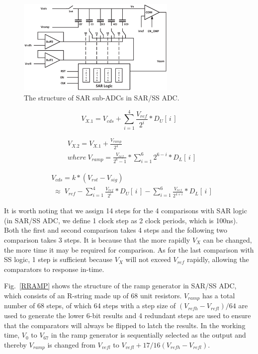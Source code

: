 \begin{figure}[htbp]
	\centerline{\includegraphics[width=3in]{./Figures/SAR.eps}}
	\caption{The structure of SAR sub-ADCs in SAR/SS ADC.}
	\label{SAR}
\end{figure}

\begin{equation}
	V_{X.1}=V_{cds}+\sum_{i=1}^{4} {\frac{V_{ref}}{2^{i}}\ast{D_{U}\left[\,i\,\right]}}
	\label{eq4}
\end{equation}

\begin{equation}
	\begin{aligned}
		&V_{X.2}=V_{X.1}+\frac{V_{ramp}}{2^4}\\ &where\  V_{ramp}=\frac{V_{ref}}{2^6-1}\ast\sum_{i=1}^{6}2^{6-i}\ast{D_{L}\left[\,i\,\right]}
		\label{eq5}
	\end{aligned}	
\end{equation}

\begin{equation}
	\begin{aligned}
		&V_{cds}=k\ast(V_{rst}-V_{sig})\\
		&\;{\approx}\;{V_{ref}-\sum_{i=1}^{4} \frac{V_{ref}}{2^{i}}\ast{D_{U}\left[\,i\,\right]}-\sum_{i=1}^{6} \frac{V_{ref}}{2^{4+i}}\ast{D_{L}\left[\,i\,\right]}}
		\label{eq6}
	\end{aligned}
\end{equation}

It is worth noting that we assign 14 steps for the 4 comparisons with SAR logic (in SAR/SS ADC, we define 1 clock step as 2 clock periods, which is 100ns). Both the first and second comparison takes 4 steps and the following two comparison takes 3 steps. It is because that the more rapidly $V_{X}$ can be changed, the more time it may be required for comparison. As for the last comparison with SS logic, 1 step is sufficient because $V_{X}$ will not exceed $V_{ref}$ rapidly, allowing the comparators to response in-time.

Fig.~\ref{RRAMP} shows the structure of the ramp generator in SAR/SS ADC, which consists of an R-string made up of 68 unit resistors. $V_{ramp}$ has a total number of 68 steps,
of which 64 steps with a step size of $(V_{refh}-V_{refl})/64$ are used to generate the lower 6-bit results and 4 redundant steps are used to ensure that the comparators 
will always be flipped to latch the results. In the working time, $V_{0}$ to $V_{67}$ in the ramp generator is sequentially selected as the output and thereby 
$V_{ramp}$ is changed from $V_{vefl}$ to $V_{vefl}+17/16(V_{refh}-V_{refl})$.

